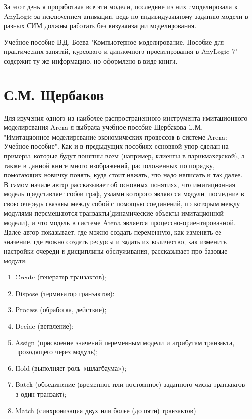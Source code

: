 \documentclass[a4paper,14pt]{report} %
\begin{document}
За этот день я проработала все эти модели, последние из них смоделировала в AnyLogic за исключением анимации, ведь по индивидуальному заданию модели в разных СИМ должны работать без визуализации моделирования.

Учебное пособие В.Д. Боева "Компьютерное моделирование. Пособие для практических занятий, курсового и дипломного проектирования в AnyLogic 7" содержит ту же информацию, но оформлено в виде книги.

\section{С.М. Щербаков}
Для изучения одного из наиболее распространенного инструмента имитационного моделирования Arena я выбрала учебное пособие Щербакова С.М. "Имитационное моделирование экономических процессов в системе Arena: Учебное пособие". Как и в предыдущих пособиях основной упор сделан на примеры, которые будут понятны всем (например, клиенты в парикмахерской), а также в данной книге много изображений, расположенных по порядку, помогающих новичку понять, куда стоит нажать, что надо написать и так далее. В самом начале автор рассказывает об основных понятиях, что имитационная модель представляет собой граф, узлами которого являются модули, последние в свою очередь связаны между собой с помощью соединений, по которым между модулями перемещаются транзакты(динамические объекты имитационной модели), и что модель в системе Arena является процессно-ориентированной. Далее автор показывает, где можно создать переменную, как изменить ее значение, где можно создать ресурсы и задать их количество, как изменить настройки очереди и дисциплины обслуживания, рассказывает про базовые модули:
\begin{enumerate} %
\item Create (генератор транзактов);
\item Dispose (терминатор транзактов);
\item Process (обработка, действие);
\item Decide (ветвление);
\item Assign (присвоение значений переменным модели и атрибутам транзакта, проходящего через модуль);
\item Hold (выполняет роль «шлагбаума»);
\item Batch (объединение (временное или постоянное) заданного числа транзактов в один транзакт);
\item Match (синхронизация двух или более (до пяти) транзактов) 
\end{enumerate}
\end{document}
